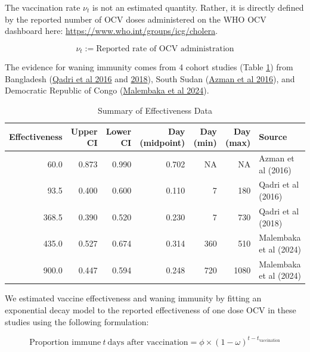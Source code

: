 \documentclass[
]{book}
\begin{document}
The vaccination rate \(\nu_t\) is not an estimated quantity. Rather, it is directly defined by the reported number of OCV doses administered on the WHO OCV dashboard here: \url{https://www.who.int/groups/icg/cholera}.

\[
\nu_t := \text{Reported rate of OCV administration}         
\]

The evidence for waning immunity comes from 4 cohort studies (Table \ref{tab:effectiveness-papers}) from Bangladesh (\href{https://www.nejm.org/doi/full/10.1056/NEJMoa1510330}{Qadri et al 2016} and \href{https://www.thelancet.com/journals/laninf/article/PIIS1473-3099(18)30108-7/fulltext}{2018}), South Sudan (\href{https://www.thelancet.com/journals/langlo/article/PIIS2214-109X(16)30211-X/fulltext}{Azman et al 2016}), and Democratic Republic of Congo (\href{https://www.thelancet.com/journals/laninf/article/PIIS1473-3099(23)00742-9/fulltext}{Malembaka et al 2024}).

\begin{table}

\caption{\label{tab:effectiveness-papers}Summary of Effectiveness Data}
\centering
\begin{tabular}[t]{r|r|r|r|r|r|l}
\hline
Effectiveness & Upper CI & Lower CI & Day (midpoint) & Day (min) & Day (max) & Source\\
\hline
60.0 & 0.873 & 0.990 & 0.702 & NA & NA & Azman et al (2016)\\
\hline
93.5 & 0.400 & 0.600 & 0.110 & 7 & 180 & Qadri et al (2016)\\
\hline
368.5 & 0.390 & 0.520 & 0.230 & 7 & 730 & Qadri et al (2018)\\
\hline
435.0 & 0.527 & 0.674 & 0.314 & 360 & 510 & Malembaka et al (2024)\\
\hline
900.0 & 0.447 & 0.594 & 0.248 & 720 & 1080 & Malembaka et al (2024)\\
\hline
\end{tabular}
\end{table}

We estimated vaccine effectiveness and waning immunity by fitting an exponential decay model to the reported effectiveness of one dose OCV in these studies using the following formulation:

\begin{equation} 
\text{Proportion immune}\ t \ \text{days after vaccination} = \phi \times (1 - \omega) ^ {t-t_{\text{vaccination}}}
\label{eq:omega}
\end{equation}
\end{document}
